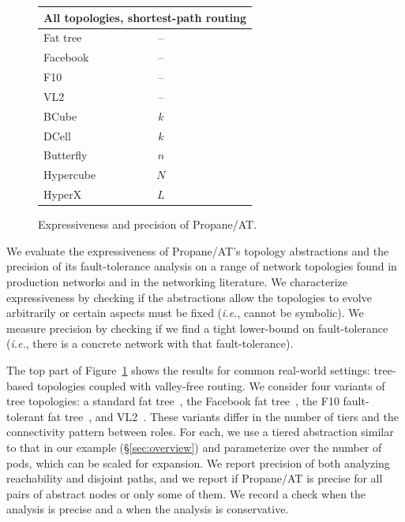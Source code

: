 \documentclass[numbers, 10pt, preprint]{sigplanconf}
\newcommand{\cmark}{\ding{51}}
\newcommand{\xmark}{\ding{55}}
\newcommand{\IE}{\emph{i.e.}}
\newcommand{\sysname}{{\text{}\small \sf Propane/AT}\xspace}
\newcommand{\Conserv}{\cal{C}}
\begin{document}
\begin{figure}[t!]
\begin{center}
\begin{tabular}{| l | c| c | c | c | c | }
      \multicolumn{6}{l}{\textbf{All topologies, shortest-path routing}} \\ \hline

      Fat tree~\cite{fattree} & -- & \cmark & \cmark & \cmark & \Conserv  \\ \hline
      Facebook~\cite{facebook-fattree} & -- & \cmark & \cmark & \cmark & \cmark \\ \hline
      F10~\cite{f10-fattree} & -- & \cmark & \cmark & \cmark & \Conserv \\ \hline
      VL2~\cite{vl2-fattree} & -- & \cmark & \cmark & \cmark & \Conserv \\ \hline
      BCube~\cite{bcube} & $k$ & \cmark & \cmark & \Conserv & \Conserv \\ \hline
      DCell~\cite{dcell} & $k$ & \cmark & \cmark & \Conserv & \Conserv \\ \hline
      Butterfly~\cite{butterfly} & $n$ & \cmark & \cmark & \cmark & \cmark \\ \hline
      Hypercube & $N$ & \cmark & \cmark & \cmark & \cmark \\ \hline
      HyperX~\cite{hyperx} & $L$ & \cmark & \cmark & \cmark & \cmark \\ \hline
      \end{tabular}
  \end{center}
  \vspace{-.8em}
  \caption{Expressiveness and precision of \sysname.}
  \label{fig:analysis-precision}
  \vspace{-.8em}
\end{figure}


We evaluate the expressiveness of \sysname's topology abstractions and the precision of its fault-tolerance analysis on a range of network topologies found in production networks and in the networking literature. We characterize expressiveness by checking if the abstractions allow the topologies to evolve arbitrarily or certain aspects must be fixed (\IE, cannot be symbolic). We measure precision by checking if we find a tight lower-bound on fault-tolerance (\IE, there is a concrete network with that fault-tolerance).

The top part of Figure~\ref{fig:analysis-precision} shows the results for common real-world settings: tree-based topologies coupled with valley-free routing.
We consider four variants of tree topologies: a standard fat tree~\cite{fattree}, the Facebook fat tree~\cite{facebook-fattree}, the F10 fault-tolerant fat tree~\cite{f10-fattree}, and VL2~\cite{vl2-fattree}. These variants differ in the number of tiers and the connectivity pattern between roles. For each, we use a tiered abstraction similar to that in our example (\S\ref{sec:overview}) and parameterize over the number of pods, which can be scaled for expansion. We report precision of both analyzing reachability and disjoint paths, and we report if \sysname is precise for all pairs of abstract nodes or only some of them. We record a check when the analysis is precise and a \Conserv{} when the analysis is conservative.
\end{document}
